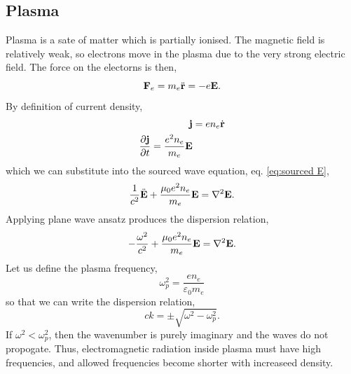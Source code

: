 \documentclass{book}
\begin{document}
\subsection{Plasma}
Plasma is a sate of matter which is partially ionised. The magnetic field is relatively weak, so electrons move in the plasma due to the very strong electric field. The force on the electorns is then,
\begin{equation}
	\vb{F}_e = m_e \Ddot{\vb{r}} = - e \vb{E}.
\end{equation}
By definition of current density,
\begin{align}
	\vb{j} & = en_e \Dot{\vb{r}} \\
	\pdv{\vb{j}}{t} = \frac{e^2n_e}{m_e}\vb{E}
\end{align}
which we can substitute into the sourced wave equation, eq. \eqref{eq:sourced E}, 
\begin{equation}
	\frac{1}{c^2}\Ddot{\vb{E}} + \frac{\mu_0 e^2n_e}{m_e} \vb{E} = \laplacian\vb{E}.
\end{equation}
Applying plane wave ansatz produces the dispersion relation,
\begin{equation}
	-\frac{\omega^2}{c^2} + \frac{\mu_0e^2n_e}{m_e}\vb{E} = \laplacian{\vb{E}}.
\end{equation}
Let us define the plasma frequency,
\begin{equation}
	\omega_p^2 = \frac{en_e}{\varepsilon_0 m_e}
\end{equation}
so that we can write the dispersion relation,
\begin{equation}
	ck = \pm \sqrt{\omega^2 - \omega_p^2}.
\end{equation}
If $\omega^2 < \omega_p^2$, then the wavenumber is purely imaginary and the waves do not propogate. Thus, electromagnetic radiation inside plasma must have high frequencies, and allowed frequencies become shorter with increaseed density.
\end{document}
